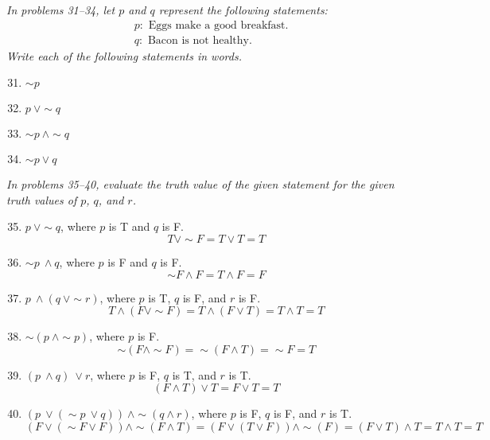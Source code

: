 \emph{In problems 31--34, let $p$ and $q$ represent the following statements:}
\begin{align*}
&p: \textrm{ Eggs make a good breakfast.}\\
&q: \textrm{ Bacon is not healthy.}
\end{align*}
\emph{Write each of the following statements in words.}
\begin{enumerate}
\setcounter{enumi}{30}

\item $\sim p$ 

\item $p\ \vee \sim q$ 

\item $\sim p\ \wedge \sim q$ 

\item $\sim p \vee q$ 
\end{enumerate}

\emph{In problems 35--40, evaluate the truth value of the given statement for the given truth values of $p$, $q$, and $r$.}
\begin{enumerate}
\setcounter{enumi}{34}

\item $p\ \vee \sim q$, where $p$ is T and $q$ is F. 
\[T \vee \sim F = T \vee T = T\]

\item $\sim p\ \wedge q$, where $p$ is F and $q$ is F. 
\[\sim F \wedge F = T \wedge F = F\]

\item $p\ \wedge (q\ \vee \sim r)$, where $p$ is T, $q$ is F, and $r$ is F. 
\[T \wedge (F \vee \sim F) = T \wedge (F \vee T) = T \wedge T = T\]

\item $\sim (p\ \wedge \sim p)$, where $p$ is F. 
\[\sim (F \wedge \sim F) = \sim (F \wedge T) = \sim F = T\]

\item $(p\ \wedge q)\ \vee r$, where $p$ is F, $q$ is T, and $r$ is T. 
\[(F \wedge T) \vee T = F \vee T = T\]

\item $(p\ \vee (\sim p\ \vee q))\ \wedge \sim(q \wedge r)$, where $p$ is F, $q$ is F, and $r$ is T. 
\[(F \vee (\sim F \vee F)) \wedge \sim (F \wedge T) = (F \vee (T \vee F)) \wedge \sim (F) = (F \vee T) \wedge T = T \wedge T = T\]
\end{enumerate}

